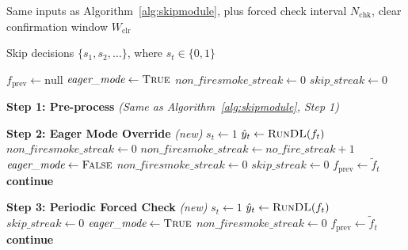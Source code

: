 \begin{algorithm}[ht]
\caption{Skip Module $\mathcal{S}$ with Eager Mode and Periodic Forced Check}
\label{alg:skipmodule_eager}
\begin{algorithmic}[1]

\Require Same inputs as Algorithm~\ref{alg:skipmodule},
plus forced check interval $N_{\text{chk}}$,
clear confirmation window $W_{\text{clr}}$

\Ensure Skip decisions $\{s_1, s_2, \dots\}$, where $s_t \in \{0,1\}$

\State $f_{\text{prev}} \leftarrow \text{null}$
\State $\textit{eager\_mode} \leftarrow \textsc{True}$    
\State $\textit{non\_firesmoke\_streak} \leftarrow 0$            
\State $\textit{skip\_streak} \leftarrow 0$               


    \Statex \hspace{1.5em} \textbf{Step 1: Pre-process}
    \State \textit{(Same as Algorithm~\ref{alg:skipmodule}, Step 1)}

    \Statex \hspace{1.5em} \textbf{Step 2: Eager Mode Override} \hfill \textit{(new)}
        \State $s_t \leftarrow 1$  
        \State $\hat{y}_t \leftarrow \textsc{RunDL}(f_t)$
            \State $\textit{non\_firesmoke\_streak} \leftarrow 0$  
        \Else
            \State $\textit{non\_firesmoke\_streak} \leftarrow \textit{no\_fire\_streak} + 1$
                \State $\textit{eager\_mode} \leftarrow \textsc{False}$  
                \State $\textit{non\_firesmoke\_streak} \leftarrow 0$
                \State $\textit{skip\_streak} \leftarrow 0$
            \EndIf
        \EndIf
        \State $f_{\text{prev}} \leftarrow \tilde{f}_t$
        \State \textbf{continue}
    \EndIf

    \Statex \hspace{1.5em} \textbf{Step 3: Periodic Forced Check} \hfill \textit{(new)}
        \State $s_t \leftarrow 1$  
        \State $\hat{y}_t \leftarrow \textsc{RunDL}(f_t)$
        \State $\textit{skip\_streak} \leftarrow 0$
            \State $\textit{eager\_mode} \leftarrow \textsc{True}$  
            \State $\textit{non\_firesmoke\_streak} \leftarrow 0$
        \EndIf
        \State $f_{\text{prev}} \leftarrow \tilde{f}_t$
        \State \textbf{continue}
    \EndIf


\end{algorithmic}
\end{algorithm}
